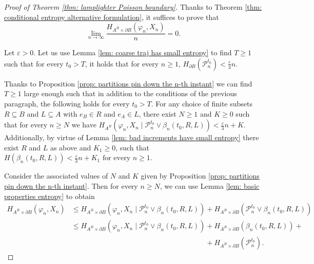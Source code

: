 \documentclass[reqno,oneside,11pt]{amsart}
\theoremstyle{plain}
\theoremstyle{definition}
\begin{document}
\begin{proof}[Proof of Theorem \ref{thm: lamplighter Poisson boundary}]
	
	Thanks to Theorem \ref{thm: conditional entropy alternative formulation}, it suffices to prove that 
	\begin{equation*}
		\lim_{n\to \infty}\frac{H_{A^B\times \partial B}(\varphi_n,X_n)}{n}=0.
	\end{equation*}
	
	Let $\varepsilon>0$. Let us use Lemma \ref{lem: coarse traj has small entropy} to find $T\ge 1$ such that for every $t_0>T$, it holds that for every $n\ge 1$, $H_{\partial B}(\mathcal{P}_n^{t_0})<\frac{\varepsilon}{3} n$.
	
	Thanks to Proposition \ref{prop: partitions pin down the n-th instant} we can find $T\ge 1$ large enough such that in addition to the conditions of the previous paragraph, the following holds for every $t_0>T$. For any choice of finite subsets $R\subseteq B$ and $L\subseteq A$ with $e_B\in R$ and $e_A\in L$, there exist $N\ge 1$ and $K\ge 0$ such that for every $n\ge N$ we have $H_{A^B}\left(\varphi_n,X_n\mid \mathcal{P}_n^{t_0}\vee\beta_n(t_0,R,L)\right)<\frac{\varepsilon}{3} n +K.$ Additionally, by virtue of Lemma \ref{lem: bad increments have small entropy} there exist $R$ and $L$ as above and $K_1\ge 0$, such that $H\left(\beta_n(t_0,R,L)\right)<\frac{\varepsilon}{3}n+K_1 \text{ for every } n\ge 1.$
	
	Consider the associated values of $N$ and $K$ given by Proposition \ref{prop: partitions pin down the n-th instant}. Then for every $n\ge N$, we can use Lemma \ref{lem: basic properties entropy} to obtain
	\begin{align*}
		H_{A^B\times \partial B}\left(\varphi_n,X_n	\right)&\le H_{A^B\times \partial B}\left(\varphi_n,X_n \mid \mathcal{P}_n^{t_0}\vee \beta_n(t_0,R,L)\right)+ H_{A^B\times \partial B}( \mathcal{P}_n^{t_0}\vee \beta_n(t_0,R,L))\\
		&\le H_{A^B\times \partial B}\left(\varphi_n,X_n \mid \mathcal{P}_n^{t_0}\vee \beta_n(t_0,R,L)\right)+H_{A^B\times \partial B}\left(\beta_n(t_0,R,L)\right)+\\
		& \phantom{=H_{A^B\times \partial B}\left(\varphi_n,X_n \mid \mathcal{P}_n^{t_0}\vee \beta_n(t_0,R,L)\right)}+H_{A^B\times \partial B}(\mathcal{P}_n^{t_0}).
	\end{align*}
	

\end{proof}
\end{document}
